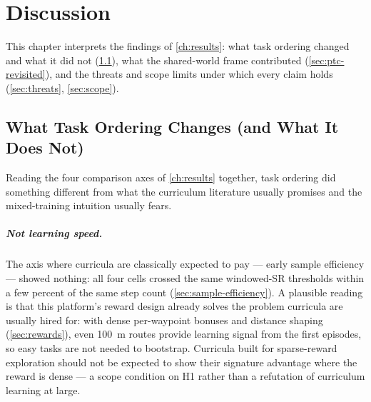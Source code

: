 \chapter{Discussion}
\label{ch:discussion}

This chapter interprets the findings of \cref{ch:results}: what task
ordering changed and what it did not (\cref{sec:ordering}), what the
shared-world frame contributed (\cref{sec:ptc-revisited}), and the
threats and scope limits under which every claim holds
(\cref{sec:threats}, \cref{sec:scope}).

\section{What Task Ordering Changes (and What It Does Not)}
\label{sec:ordering}

Reading the four comparison axes of \cref{ch:results} together, task
ordering did something different from what the curriculum literature
usually promises and the mixed-training intuition usually fears.

\paragraph{Not learning speed.}
The axis where curricula are classically expected to pay --- early
sample efficiency --- showed nothing: all four cells crossed the same
windowed-SR thresholds within a few percent of the same step count
(\cref{sec:sample-efficiency}). A plausible reading is that this
platform's reward design already solves the problem curricula are
usually hired for: with dense per-waypoint bonuses and distance shaping
(\cref{sec:rewards}), even \SI{100}{m} routes provide learning signal
from the first episodes, so easy tasks are not needed to bootstrap.
Curricula built for sparse-reward exploration should not be expected to
show their signature advantage where the reward is dense --- a scope
condition on H1 rather than a refutation of curriculum learning at
large.

